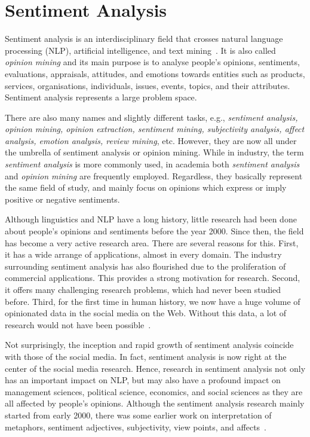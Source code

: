\section{Sentiment Analysis}
\label{sec:sentiment-analysis}

Sentiment analysis is an interdisciplinary field
that crosses natural language processing (NLP),
artificial intelligence, and text mining~\cite{Dri18}.
It is also called \emph{opinion mining} and its main purpose is
to analyse people's opinions, sentiments, evaluations, appraisals, attitudes, and emotions towards entities such as products, services,
organisations, individuals, issues, events, topics, and their attributes.
Sentiment analysis represents a large problem space.

There are also many names and slightly different tasks,
e.g., \emph{sentiment analysis, opinion mining, opinion extraction, sentiment mining, subjectivity analysis, affect analysis, emotion analysis,
review mining}, etc.
However, they are now all under the umbrella
of sentiment analysis or opinion mining.
While in industry, the term \emph{sentiment analysis} is more commonly used,
in academia both \emph{sentiment analysis}
and \emph{opinion mining} are frequently employed.
Regardless, they basically represent the same field of study,
and mainly focus on opinions
which express or imply positive or negative sentiments.

Although linguistics and NLP have a long history,
little research had been done about people's opinions and sentiments
before the year 2000.
Since then, the field has become a very active research area.
There are several reasons for this.
First, it has a wide arrange of applications, almost in every domain.
The industry surrounding sentiment analysis has also flourished
due to the proliferation of commercial applications.
This provides a strong motivation for research.
Second, it offers many challenging research problems,
which had never been studied before.
Third, for the first time in human history,
we now have a huge volume of opinionated data in the social media on the Web. Without this data, a lot of research would not have been possible~\cite{Liu12}.

Not surprisingly, the inception and rapid growth of sentiment analysis coincide with those of the social media.
In fact, sentiment analysis is now right at the center
of the social media research.
Hence, research in sentiment analysis not only has an important impact on NLP, but may also have a profound impact on management sciences,
political science, economics, and social sciences
as they are all affected by people's opinions.
Although the sentiment analysis research mainly started from early 2000,
there was some earlier work on interpretation of metaphors,
sentiment adjectives, subjectivity, view points, and affects~\cite{HM97,Hea92,WBO99}.

